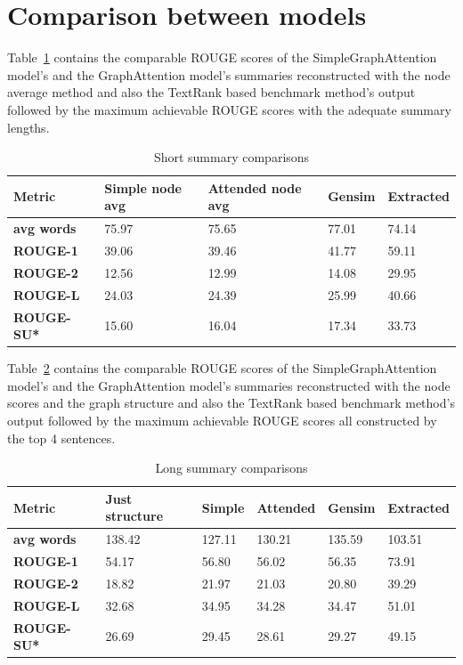 \section{Comparison between models}

Table~\ref{tab:short} contains the comparable ROUGE scores of the SimpleGraphAttention model's and the GraphAttention model's summaries reconstructed with the node average method and also the TextRank based benchmark method's output followed by the maximum achievable ROUGE scores with the adequate summary lengths.

\begin{table}[!ht]
	\centering
	\begin{tabular}{| l | l | l | l | l |}
		\hline
		\textbf{Metric}&\textbf{Simple node avg}&\textbf{Attended node avg}&\textbf{Gensim}&\textbf{Extracted} \\ \hline \hline
		\textbf{avg words}&75.97&75.65&77.01&74.14 \\ \hline
		\textbf{ROUGE-1}&39.06&39.46&41.77&59.11 \\ \hline
		\textbf{ROUGE-2}&12.56&12.99&14.08&29.95 \\ \hline
		\textbf{ROUGE-L}&24.03&24.39&25.99&40.66 \\ \hline
		\textbf{ROUGE-SU*}&15.60&16.04&17.34&33.73 \\ \hline
	\end{tabular}
	\caption{Short summary comparisons}
	\label{tab:short}
\end{table}

Table~\ref{tab:long} contains the comparable ROUGE scores of the SimpleGraphAttention model's and the GraphAttention model's summaries reconstructed with the node scores and the graph structure and also the TextRank based benchmark method's output followed by the maximum achievable ROUGE scores all constructed by the top 4 sentences.

\begin{table}[!ht]
	\centering
	\begin{tabular}{| l | l | l | l | l | l |}
		\hline
		\textbf{Metric}&\textbf{Just structure}&\textbf{Simple}&\textbf{Attended}&\textbf{Gensim}&\textbf{Extracted} \\ \hline \hline
		\textbf{avg words}&138.42&127.11&130.21&135.59&103.51 \\ \hline
		\textbf{ROUGE-1}&54.17&56.80&56.02&56.35&73.91 \\ \hline
		\textbf{ROUGE-2}&18.82&21.97&21.03&20.80&39.29 \\ \hline
		\textbf{ROUGE-L}&32.68&34.95&34.28&34.47&51.01 \\ \hline
		\textbf{ROUGE-SU*}&26.69&29.45&28.61&29.27&49.15 \\ \hline
	\end{tabular}
	\caption{Long summary comparisons}
	\label{tab:long}
\end{table}
